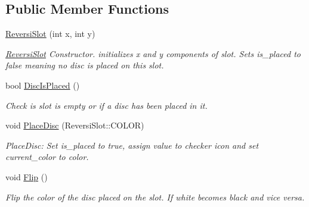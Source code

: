 \subsection*{Public Member Functions}
\begin{DoxyCompactItemize}
\item 
\hyperlink{classReversiSlot_a68d3c8efd58f9754fd7338287a391550}{Reversi\+Slot} (int x, int y)
\begin{DoxyCompactList}\small\item\em \hyperlink{classReversiSlot}{Reversi\+Slot} Constructor. initializes x and y components of slot. Sets is\+\_\+placed to false meaning no disc is placed on this slot. \end{DoxyCompactList}\item 
bool \hyperlink{classReversiSlot_a7816512c180521bc7d9f91bb4d87e7e1}{Disc\+Is\+Placed} ()
\begin{DoxyCompactList}\small\item\em Check is slot is empty or if a disc has been placed in it. \end{DoxyCompactList}\item 
\mbox{\label{classReversiSlot_abe87bcc006fcd895d9149aee9fed0bb9}} 
void \hyperlink{classReversiSlot_abe87bcc006fcd895d9149aee9fed0bb9}{Place\+Disc} (Reversi\+Slot\+::\+C\+O\+L\+OR)
\begin{DoxyCompactList}\small\item\em Place\+Disc\+: Set is\+\_\+placed to true, assign value to checker icon and set current\+\_\+color to color. \end{DoxyCompactList}\item 
\mbox{\label{classReversiSlot_ac6cc6ebc87a5042b2725207727992d4e}} 
void \hyperlink{classReversiSlot_ac6cc6ebc87a5042b2725207727992d4e}{Flip} ()
\begin{DoxyCompactList}\small\item\em Flip the color of the disc placed on the slot. If white becomes black and vice versa. \end{DoxyCompactList}\end{DoxyCompactItemize}
